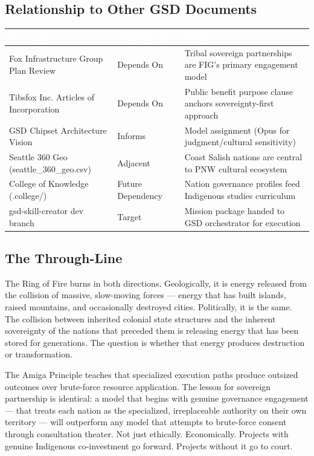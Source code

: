 \documentclass[11pt,letterpaper]{article}
\newcommand{\tableheader}[1]{\textbf{\sffamily\textcolor{white}{#1}}}
\begin{document}
\subsection{Relationship to Other GSD Documents}

\begin{center}
\begin{tabularx}{\textwidth}{L{4cm}L{3cm}X}
\toprule
{}
\tableheader{Document} & \tableheader{Relationship} & \tableheader{Notes} \\
\midrule
Fox Infrastructure Group Plan Review & Depends On & Tribal sovereign partnerships are FIG's primary engagement model \\
Tibsfox Inc. Articles of Incorporation & Depends On & Public benefit purpose clause anchors sovereignty-first approach \\
GSD Chipset Architecture Vision & Informs & Model assignment (Opus for judgment/cultural sensitivity) \\
Seattle 360 Geo (seattle\_360\_geo.csv) & Adjacent & Coast Salish nations are central to PNW cultural ecosystem \\
College of Knowledge (.college/) & Future Dependency & Nation governance profiles feed Indigenous studies curriculum \\
gsd-skill-creator dev branch & Target & Mission package handed to GSD orchestrator for execution \\
\bottomrule
\end{tabularx}
\end{center}

\subsection{The Through-Line}

The Ring of Fire burns in both directions. Geologically, it is energy released from the collision of massive, slow-moving forces --- energy that has built islands, raised mountains, and occasionally destroyed cities. Politically, it is the same. The collision between inherited colonial state structures and the inherent sovereignty of the nations that preceded them is releasing energy that has been stored for generations. The question is whether that energy produces destruction or transformation.

The Amiga Principle teaches that specialized execution paths produce outsized outcomes over brute-force resource application. The lesson for sovereign partnership is identical: a model that begins with genuine governance engagement --- that treats each nation as the specialized, irreplaceable authority on their own territory --- will outperform any model that attempts to brute-force consent through consultation theater. Not just ethically. Economically. Projects with genuine Indigenous co-investment go forward. Projects without it go to court.
\end{document}
